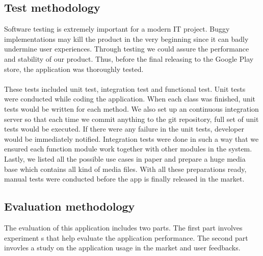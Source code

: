 \subsection{Test methodology}
Software testing is extremely important for a modern IT project. Buggy implementations may kill the product in the very beginning since it can badly undermine user experiences. Through testing we could assure the performance and stability of our product. Thus, before the final releasing to the Google Play store, the application was thoroughly tested.\\
\\
These tests included unit test, integration test and functional test.
Unit tests were conducted while coding the application. When each class was finished, unit tests would be written for each method. We also set up an continuous integration server so that each time we commit anything to the git repository, full set of unit tests would be executed. If there were any failure in the unit tests, developer would be immediately notified. Integration tests were done in such a way that we ensured each function module work together with other modules in the system. Lastly, we listed all the possible use cases in paper and prepare a huge media base which contains all kind of media files. With all these preparations ready, manual tests were conducted before the app is finally released in the market.

\subsection{Evaluation methodology}
The evaluation of this application includes two parts. The first part involves experiment
s
that help evaluate the application performance. The second part invovles a study on the application usage in the market and user feedbacks.

